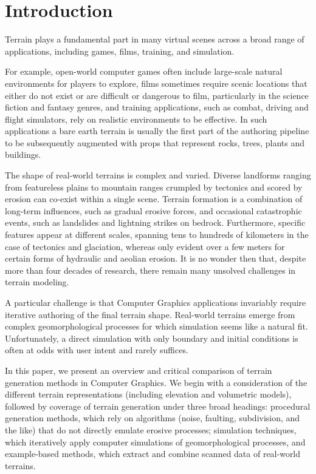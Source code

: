 \documentclass{article}
\begin{document}
\section{Introduction}

Terrain plays a fundamental part in many virtual scenes across a broad range of applications, including games, films, training, and simulation.

For example, open-world computer games often include large-scale natural environments for players to explore, films sometimes require scenic locations that either do not exist or are difficult or dangerous to film, particularly in the science fiction and fantasy genres, and training applications, such as combat, driving and flight simulators, rely on realistic environments to be effective. In such applications a bare earth terrain is usually the first part of the authoring pipeline to be subsequently augmented with props that represent rocks, trees, plants and buildings.

The shape of real-world terrains is complex and varied. Diverse landforms ranging from featureless plains to mountain ranges crumpled by tectonics and scored by erosion can co-exist within a single scene. Terrain formation is a combination of long-term influences, such as gradual erosive forces, and occasional catastrophic events, such as landslides and lightning strikes on bedrock. Furthermore, specific features appear at different scales, spanning tens to hundreds of kilometers in the case of tectonics and glaciation, whereas only evident over a few meters for certain forms of hydraulic and aeolian erosion. It is no wonder then that, despite more than four decades of research, there remain many unsolved challenges in terrain modeling.

A particular challenge is that Computer Graphics applications invariably require iterative authoring of the final terrain shape. Real-world terrains emerge from complex geomorphological processes for which simulation seems like a natural fit. Unfortunately, a direct simulation with only boundary and initial conditions is often at odds with user intent and rarely suffices.

In this paper, we present an overview and critical comparison of terrain generation methods in Computer Graphics. We begin with a consideration of the different terrain representations (including elevation and volumetric models), followed by coverage of terrain generation under three broad headings: procedural generation methods, which rely on algorithms (noise, faulting, subdivision, and the like) that do not directly emulate erosive processes; simulation techniques, which iteratively apply computer simulations of geomorphological processes, and example-based methods, which extract and combine scanned data of real-world terrains.
\end{document}
